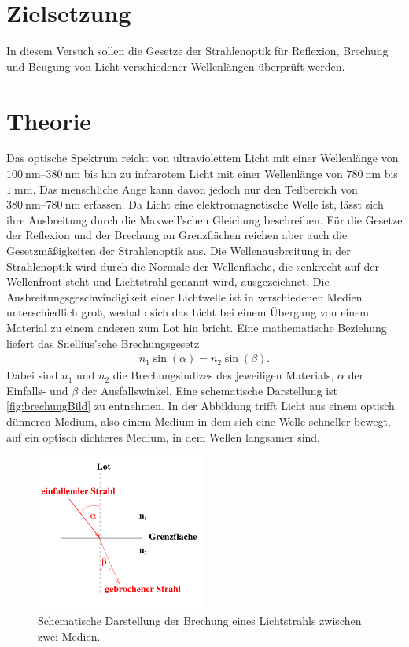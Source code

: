\section{Zielsetzung}
\label{sec:Ziel}

In diesem Versuch sollen die Gesetze der Strahlenoptik für Reflexion, Brechung und Beugung von Licht verschiedener Wellenlängen überprüft werden.

\section{Theorie}
\label{sec:Theorie}
Das optische Spektrum reicht von ultraviolettem Licht mit einer Wellenlänge von $\SIrange{100}{380}{\nano\meter}$ bis hin zu infrarotem Licht mit einer Wellenlänge
von $\SI{780}{\nano\meter}$ bis $\SI{1}{\mm}$. Das menschliche Auge kann davon jedoch nur den Teilbereich von $\SIrange{380}{780}{\nano\meter}$ erfassen. \newline
Da Licht eine elektromagnetische Welle ist, lässt sich ihre Ausbreitung durch die Maxwell'schen Gleichung beschreiben. Für die Gesetze der Reflexion und der Brechung 
an Grenzflächen reichen aber auch die Gesetzmäßigkeiten der Strahlenoptik aus.\newline
Die Wellenausbreitung in der Strahlenoptik wird durch die Normale der Wellenfläche, die senkrecht auf der Wellenfront steht und Lichtstrahl genannt wird, ausgezeichnet.
Die Ausbreitungsgeschwindigikeit einer Lichtwelle ist in verschiedenen Medien unterschiedlich groß, weshalb sich das Licht bei einem Übergang von einem Material zu einem anderen zum Lot hin bricht.
Eine mathematische Beziehung liefert das Snellius'sche Brechungsgesetz
\begin{align}
    \label{eqn:snellius}
    n_1 \sin(\alpha)=n_2\sin(\beta).
\end{align}
Dabei sind $n_1$ und $n_2$ die Brechungsindizes des jeweiligen Materials, $\alpha$ der Einfalls- und $\beta$ der Ausfallswinkel.
Eine schematische Darstellung ist \autoref{fig:brechungBild} zu entnehmen. In der Abbildung trifft Licht aus einem optisch dünneren Medium, also einem Medium in dem sich eine Welle schneller bewegt,
auf ein optisch dichteres Medium, in dem Wellen langsamer sind.

\begin{figure}[H]
    \centering
    \includegraphics[width=0.5\textwidth]{data/brechung.png}
    \caption{Schematische Darstellung der Brechung eines Lichtstrahls zwischen zwei Medien\cite{Anleitung400}.}
    \label{fig:brechungBild}
\end{figure}


